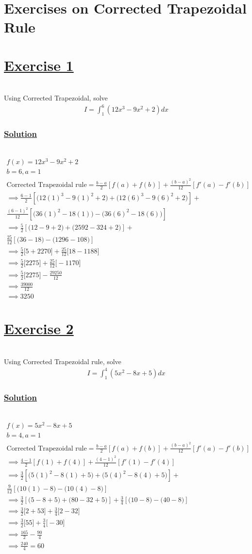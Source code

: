 \documentclass[12pt]{report}
\newcommand{\ubt}[1]{\textbf{\underline{#1}}}
\newcommand{\sps}{\\[0.2cm]}
\newcommand{\spn}[1]{\\[#1cm]}
\newcommand{\solution}{\subsubsection{\ubt{Solution}}{~}\spn{-2}}
\newcommand{\exercise}[1]{\section*{\ubt{Exercise #1}}{~}\spn{-1}}
\begin{document}
	\section{Exercises on Corrected Trapezoidal Rule}
		\exercise{1}
	Using Corrected Trapezoidal, solve
	\begin{eqnarray*}
		I = \int_1^6 (12x^3 - 9x^2 + 2) dx
	\end{eqnarray*}
	\solution
	\begin{gather*}
		f(x) = 12x^3 - 9x^2 + 2\\
		b=6, a=1\\
		\text{Corrected Trapezoidal rule} = \frac{b-a}{2}\left[f(a) + f(b)\right] + \frac{(b-a)^2}{12}\left[f'(a) - f'(b)\right]\\
		\implies \frac{6-1}{2}\left[ \bigg(12(1)^3 - 9(1)^2 + 2\bigg) + \bigg(12(6)^3 - 9(6)^2 + 2\bigg)\right] +\\ \frac{(6-1)^2}{12}\left[\bigg(36(1)^2 - 18(1)\bigg) - \bigg(36(6)^2 - 18(6)\bigg)\right]\sps
		\implies \frac{5}{2}\left[ \bigg(12-9 + 2\bigg) + \bigg(2592 - 324 + 2\bigg)\right] +\\ \frac{25}{12}\left[\bigg(36-18\bigg) - \bigg(1296 - 108\bigg)\right]\sps
		\implies \frac{5}{2}\bigg[5+2270\bigg] + \frac{25}{12}\bigg[18-1188\bigg]\sps
		\implies \frac{5}{2}\bigg[2275\bigg] + \frac{25}{12}\bigg[-1170\bigg]\sps
		\implies \frac{5}{2}\bigg[2275\bigg] - \frac{29250}{12}\sps
		\implies \frac{39000}{12}\sps
		\implies 3250
	\end{gather*}
	\newpage
	\exercise{2}
	Using Corrected Trapezoidal rule, solve
	\begin{gather*}
		I=\int_1^4(5x^2-8x+5)dx
	\end{gather*}
	\solution
	\begin{gather*}
		f(x) = 5x^2 - 8x + 5\\
		b=4, a=1\\
		\text{Corrected Trapezoidal rule} = \frac{b-a}{2}\left[f(a) + f(b)\right] + \frac{(b-a)^2}{12}\left[f'(a) - f'(b)\right] \\
		\implies \frac{4-1}{2}\left[f(1) + f(4)\right] + \frac{(4-1)^2}{12}\left[f'(1) - f'(4)\right]\\
		\implies \frac{3}{2}\left[\bigg(5(1)^2 - 8(1) + 5\bigg) + \bigg(5(4)^2 - 8(4)+5\bigg)\right] + \\
		\frac{9}{12}\left[\bigg(10(1) - 8\bigg) - \bigg(10(4) - 8\bigg)\right] \sps
		\implies \frac{3}{2}\left[\bigg(5 - 8 + 5\bigg) + \bigg(80 - 32+5\bigg)\right] + \frac{3}{4}\left[\bigg(10 - 8\bigg) - \bigg(40 - 8\bigg)\right] \sps
		\implies \frac{3}{2}\bigg[2+53\bigg] + \frac{3}{4}\bigg[2-32\bigg] \sps
		\implies \frac{3}{2}\bigg[55\bigg] + \frac{3}{4}\bigg[-30\bigg] \sps
		\implies \frac{165}{2} - \frac{90}{4} \sps
		\implies \frac{240}{4} = 60
	\end{gather*}
	
\end{document}
